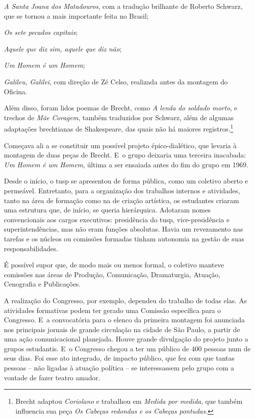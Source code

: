 \startitemize[packed]
\item{\it A Santa Joana dos Matadouros}, com a tradução brilhante de Roberto
Schwarz, que se tornou a mais importante feita no Brasil;

\item{\it Os sete pecados capitais};

\item{\it Aquele que diz sim, aquele que diz não};

\item{\it Um Homem é um Homem};

\item{\it Galileu, Galilei}, com direção de Zé Celso, realizada antes da
montagem do Oficina.
\stopitemize

Além disso, foram lidos poemas de Brecht, como {\it A lenda do
soldado morto}, e trechos de {\it Mãe Coragem}, também traduzidos por
Schwarz, além de algumas adaptações brechtianas de Shakespeare, das
quais não há maiores registros.\footnote{Brecht adaptou {\it Coriolano}
  e trabalhou em {\it Medida por medida}, que também influencia sua peça
  {\it Os Cabeças redondas e os Cabeças pontudas.}}

Começava ali a se constituir um possível projeto épico-dialético, que
levaria à montagem de duas peças de Brecht. E~o grupo deixaria uma
terceira inacabada: {\it Um Homem é um Homem}, última a ser ensaiada
antes do fim do grupo em 1969.

\subject{Organização do trabalho: comissões internas}

Desde o início, o {\sc tusp} se apresentou de forma pública, como um coletivo
aberto e permeável. Entretanto, para a organização dos trabalhos
internos e atividades, tanto na área de formação como na de criação
artística, os estudantes criaram uma estrutura que, de início, se queria
hierárquica. Adotaram nomes convencionais aos cargos executivos:
presidência do {\sc tusp}, vice-presidência e superintendências, mas
não eram funções absolutas. Havia um revezamento nas tarefas e os
núcleos ou comissões formadas tinham autonomia na gestão de suas
responsabilidades.

É possível supor que, de modo mais ou menos formal, o coletivo manteve
comissões nas áreas de Produção, Comunicação, Dramaturgia, Atuação,
Cenografia e Publicações.

A realização do Congresso, por exemplo, dependeu do trabalho de todas
elas. As atividades formativas podem ter gerado uma Comissão específica
para o Congresso. E~a convocatória para o elenco da primeira montagem
foi anunciada nos principais jornais de grande circulação na cidade de
São Paulo, a partir de uma ação comunicacional planejada. Houve grande
divulgação do projeto junto a grupos estudantis. E~o Congresso chegou a
ter um público de 400 pessoas num de seus dias. Foi esse ato integrado,
de impacto público, que fez com que tantas pessoas -- não ligadas à
atuação política -- se interessassem pelo grupo com a vontade de fazer
teatro amador.


